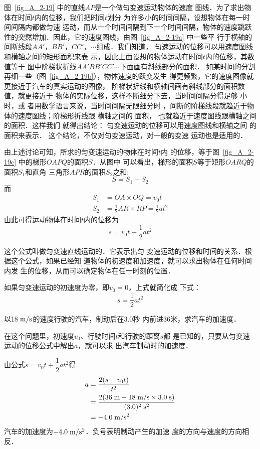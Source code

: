     图~\ref{fig_A_2-19} 中的直线$AP$是一个做匀变速运动物体的速度
图线．为了求出物体在时间$t$内的位移，我们把时间$t$划分
为许多小的时间间隔，设想物体在每一时间间隔内都做匀速
运动，而从一个时间间隔到下一个时间间隔，物体的速度跳跃
性的突然增加．因此，它的速度图线，由图~\ref{fig_A_2-19a} 中一些平
行于横轴的间断线段$AA' $，$ BB' $，$ CC' $，$ \cdots$组成．我们知道，
匀速运动的位移可以用速度图线和横轴之间的矩形面积来表
示，因此上面设想的物体运动在时间$t$内的位移，其数值等于
图中阶梯状折线$AA'BB'CC'\cdots$下面画有斜线部分的面积．
如某时间的分割再细一些（图~\ref{fig_A_2-19b}），物体速度的跃变发生
得更频繁，它的速度图像就更接近于汽车的真实运动的图像，
阶梯状折线和横轴间画有斜线部分的面积数值，就更接近于
物体的实际位移，这样不断细分下去，当时间间隔分得足够
小时，或
者用数学语言来说，当时间间隔无限细分时
，间断的阶梯线段就趋近于物体的速度图线；阶梯形折线跟
横轴之间的
面积，
也就趋近于速度图线跟横轴之间的面积．这样我们
就得出结论：
匀变速运动的位移可以用速度图线和横轴之间
的面积来表示．
这个结论，不仅对匀变速运动，对一般的变速
运动也是适用的．

由上述讨论可知，所求的匀变速运动的物体在时间$t$内
的位移，等于图~\ref{fig_A_2-19c} 中的梯形$OAPQ$的面积$S$．从图中
可以看出，梯形的面积$S$等于矩形$OARQ$的面积$S_1$和直角
三角形$APR$的面积$S_2$之和:
\[S=S_1+S_2\]
而
 \[\begin{split}
S_1&=OA\times OQ=v_0 t\\
S_2&=\frac{1}{2}AR\times RP=\frac{1}{2}at^2
\end{split}\]
由此可得运动物体在时间$t$内的位移为
\[s=v_0t+\frac{1}{2}at^2 \]

    这个公式叫做匀变速直线运动的．它表示出匀
变速运动的位移和时间的关系．根据这个公式，如果已经知
道物体的初速度和加速度，就可以求出物体在任何时间内发
生的位移，从而可以确定物体在任一时刻的位置．

    如果匀变速运动的初速度为零，即$v_0=0$，上式就简化成
下式：
\[s=\frac{1}{2}at^2  \]

\begin{example}
以18$\;\text{m}/\text{s}$的速度行驶的汽车，制动后在3.0秒
内前进36米，求汽车的加速度．
\end{example}

\begin{solution}
    在这个问题里，初速度$v_0$、行驶时间$t$和行驶的距离$s$都
是已知的，只要从匀变速运动的位移公式中解出$a$，就可以求
出汽车制动时的加速度．

由公式$s=v_0t+\dfrac{1}{2}at^2$得
\[\begin{split}
a&=\frac{2(s-v_0t)}{t^2}\\
&=\frac{2(36 \;\text{m} -18\;\text{m}/\text{s}\times 3.0 \;\text{s} )}{(3.0)^2 \;\text{s}^2}\\
&=-4.0\;\text{m}/\text{s}^2
\end{split} \]
    汽车的加速度为$-4.0\;\text{m}/\text{s}^2$．负号表明制动产生的加速
度的方向与速度的方向相反．

\end{solution}

